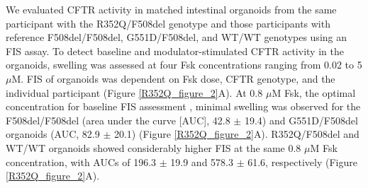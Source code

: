 We evaluated CFTR activity in matched intestinal organoids from the same participant with the R352Q/F508del genotype and those participants with reference F508del/F508del, G551D/F508del, and WT/WT genotypes using an FIS assay. To detect baseline and modulator-stimulated CFTR activity in the organoids, swelling was assessed at four Fsk concentrations ranging from 0.02 to 5 $\mu$M. FIS of organoids was dependent on Fsk dose, CFTR genotype, and the individual participant (Figure \ref{R352Q_figure_2}A). At 0.8 $\mu$M Fsk, the optimal concentration for baseline FIS assessment \cite{dekkers2016}, minimal swelling was observed for the F508del/F508del (area under the curve [AUC], 42.8 $\pm$ 19.4) and G551D/F508del organoids (AUC, 82.9 $\pm$ 20.1) (Figure \ref{R352Q_figure_2}A). R352Q/F508del and WT/WT organoids showed considerably higher FIS at the same 0.8 $\mu$M Fsk concentration, with AUCs of 196.3 $\pm$ 19.9 and 578.3 $\pm$ 61.6, respectively (Figure \ref{R352Q_figure_2}A).


